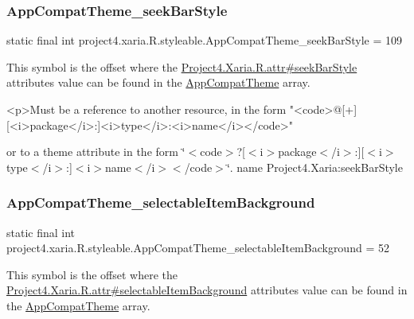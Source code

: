 \subsubsection{\texorpdfstring{App\+Compat\+Theme\+\_\+seek\+Bar\+Style}{AppCompatTheme\_seekBarStyle}}
{\footnotesize\ttfamily static final int project4.\+xaria.\+R.\+styleable.\+App\+Compat\+Theme\+\_\+seek\+Bar\+Style = 109\hspace{0.3cm}{\ttfamily [static]}}

This symbol is the offset where the \hyperlink{}{Project4.\+Xaria.\+R.\+attr\#seek\+Bar\+Style} attribute\textquotesingle{}s value can be found in the \hyperlink{classproject4_1_1xaria_1_1R_1_1styleable_aad8bec413e2350f9404e6ff0e831a85d}{App\+Compat\+Theme} array.

\begin{DoxyVerb}      <p>Must be a reference to another resource, in the form "<code>@[+][<i>package</i>:]<i>type</i>:<i>name</i></code>"
\end{DoxyVerb}
 or to a theme attribute in the form \char`\"{}$<$code$>$?\mbox{[}$<$i$>$package$<$/i$>$\+:\mbox{]}\mbox{[}$<$i$>$type$<$/i$>$\+:\mbox{]}$<$i$>$name$<$/i$>$$<$/code$>$\char`\"{}.  name Project4.\+Xaria\+:seek\+Bar\+Style \mbox{\label{classproject4_1_1xaria_1_1R_1_1styleable_ad619b68b2480af24fe678380486bcf3e}} 
\subsubsection{\texorpdfstring{App\+Compat\+Theme\+\_\+selectable\+Item\+Background}{AppCompatTheme\_selectableItemBackground}}
{\footnotesize\ttfamily static final int project4.\+xaria.\+R.\+styleable.\+App\+Compat\+Theme\+\_\+selectable\+Item\+Background = 52\hspace{0.3cm}{\ttfamily [static]}}

This symbol is the offset where the \hyperlink{}{Project4.\+Xaria.\+R.\+attr\#selectable\+Item\+Background} attribute\textquotesingle{}s value can be found in the \hyperlink{classproject4_1_1xaria_1_1R_1_1styleable_aad8bec413e2350f9404e6ff0e831a85d}{App\+Compat\+Theme} array.

